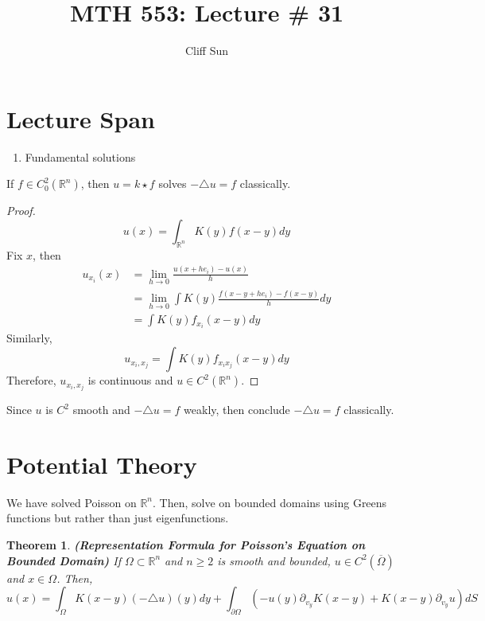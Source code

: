 \documentclass{article}
\title{MTH 553: Lecture \# 31}
\author{Cliff Sun}
\newtheorem{theorem}{Theorem}[section]
\newtheorem{one minute paper}[theorem]{One Minute Paper}
\begin{document}
\maketitle

\section*{Lecture Span}
\begin{enumerate}
    \item Fundamental solutions
\end{enumerate}

If $f \in C_0^2(\mathbb{R}^n)$, then $u = k \star f$ solves $-\triangle u = f$ classically. 

\begin{proof}
    \begin{equation}
        u(x) = \int_{\mathbb{R}^n}K(y)f(x-y)dy
    \end{equation}
    Fix $x$, then 
    \begin{align*}
        u_{x_i}(x) &= \lim_{h \rightarrow 0}\frac{u(x + he_i) - u(x)}{h} \\
        &= \lim_{h\rightarrow 0}\int K(y)\frac{f(x-y + he_i) - f(x-y)}{h}dy \\
        &= \int K(y) f_{x_i}(x-y)dy
    \end{align*}
    Similarly,
    \begin{equation}
        u_{x_i,x_j} = \int K(y)f_{x_ix_j}(x-y)dy
    \end{equation}
    Therefore, $u_{x_i,x_j}$ is continuous and $u \in C^2(\mathbb{R}^n)$. 
\end{proof}

Since $u$ is $C^2$ smooth and $-\triangle u = f$ weakly, then conclude $-\triangle u = f$ classically. 

\section*{Potential Theory}

We have solved Poisson on $\mathbb{R}^n$. Then, solve on bounded domains using Greens functions but rather than just eigenfunctions. 

\begin{theorem}
    \textbf{(Representation Formula for Poisson's Equation on Bounded Domain)} If $\Omega \subset \mathbb{R}^n$ and $n \geq 2$ is smooth and bounded, $u \in C^2(\overline{\Omega})$ and $x \in \Omega$. 
    Then, 
    \begin{equation}
            u(x) = \int_{\Omega}K(x - y)(-\triangle u)(y)dy + \int_{\partial \Omega}\left( -u(y)\partial_{v_y}K(x-y) + K(x-y)\partial_{v_y}u \right)dS    
    \end{equation}
\end{theorem}
\end{document}
